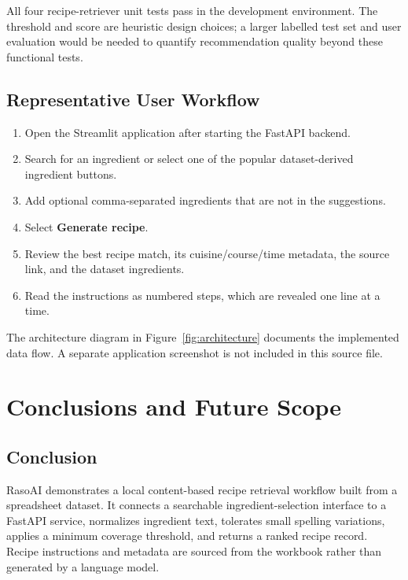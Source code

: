 \documentclass[12pt,a4paper]{report}
\begin{document}
All four recipe-retriever unit tests pass in the development environment. The threshold and score are heuristic design choices; a larger labelled test set and user evaluation would be needed to quantify recommendation quality beyond these functional tests.

\section{Representative User Workflow}
\label{sec:screenshots}

\begin{enumerate}
  \item Open the Streamlit application after starting the FastAPI backend.
  \item Search for an ingredient or select one of the popular dataset-derived ingredient buttons.
  \item Add optional comma-separated ingredients that are not in the suggestions.
  \item Select \textbf{Generate recipe}.
  \item Review the best recipe match, its cuisine/course/time metadata, the source link, and the dataset ingredients.
  \item Read the instructions as numbered steps, which are revealed one line at a time.
\end{enumerate}

The architecture diagram in Figure~\ref{fig:architecture} documents the implemented data flow. A separate application screenshot is not included in this source file.

\chapter{Conclusions and Future Scope}
\label{chap:conclusion}

\section{Conclusion}
\label{sec:conclusion}

RasoAI demonstrates a local content-based recipe retrieval workflow built from a spreadsheet dataset. It connects a searchable ingredient-selection interface to a FastAPI service, normalizes ingredient text, tolerates small spelling variations, applies a minimum coverage threshold, and returns a ranked recipe record. Recipe instructions and metadata are sourced from the workbook rather than generated by a language model.
\end{document}
